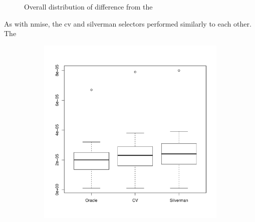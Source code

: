 \begin{figure}[htbp]
\begin{subfigure}[t]{0.45\textwidth}
        \label{fig:discussion:overall_nmise_diff_boxplot:peak}
    \end{subfigure}
    \caption{Overall distribution of  difference from the }
    \label{fig:discussion:overall_nmise_diff_boxplot}
\end{figure}

As with \gls{nmise}, the \gls{cv} and \gls{silverman} selectors performed similarly to each other.
The 
\begin{figure}[htbp]
    \centering
    \begin{subfigure}[t]{0.45\textwidth}
        \includegraphics[width=\textwidth]{results/by_overall/normalized-miae-boxplot}
        \label{fig:discussion:overall_nmiae_boxplot:unif}
    \end{subfigure}
    \begin{subfigure}[t]{0.45\textwidth}

\end{subfigure}
\end{figure}
